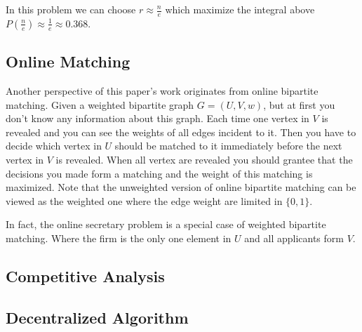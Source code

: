 In this problem we can choose $r \approx \frac{n}{e}$ which maximize the
integral above $P(\frac{n}{e}) \approx \frac{1}{e} \approx 0.368$.

\subsection{Online Matching}

Another perspective of this paper's work originates from online bipartite 
matching. Given a weighted bipartite graph $G = (U, V, w)$, but at first
you don't know any information about this graph. 
Each time one vertex in $V$ is revealed and you can see the weights of
all edges incident to it. Then you have to decide which vertex in $U$
should be matched to it immediately before the next vertex in $V$ is
revealed. When all vertex are revealed you should grantee that the decisions
you made form a matching and the weight of this matching is maximized.
Note that the unweighted version of online bipartite matching 
can be viewed as the weighted one where the edge weight 
are limited in $\{0, 1\}$.

In fact, the online secretary problem is a special case of weighted 
bipartite matching. Where the firm is the only one element in $U$ 
and all applicants form $V$.

\subsection{Competitive Analysis}

\subsection{Decentralized Algorithm}

